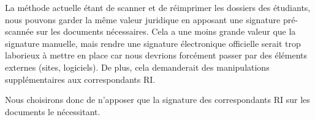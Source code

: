 La méthode actuelle étant de scanner et de réimprimer les dossiers des étudiants, nous pouvons garder la même valeur juridique en apposant une signature pré-scannée sur les documents nécessaires. Cela a une moins grande valeur que la signature manuelle, mais rendre une signature électronique officielle serait trop laborieux à mettre en place car nous devrions forcément passer par des éléments externes (sites, logiciels). De plus, cela demanderait des manipulations supplémentaires aux correspondants RI.

Nous choisirons donc de n'apposer que la signature des correspondants RI sur les documents le nécessitant.
